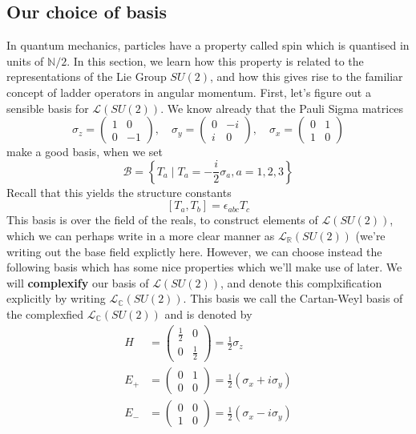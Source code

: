 \subsection{Our choice of basis}  
In quantum mechanics, particles have a property called spin which is quantised in units of $\mathbb{ N} / 2 $. In this section, we learn how this property is related to the representations of the Lie Group $SU(2)$, and how this gives rise to the familiar concept of ladder operators in angular momentum. First, let's figure out a sensible basis for $\mathcal{ L }( SU(2) ) $. We know already that the Pauli Sigma matrices \[ 
\sigma_z = \begin{pmatrix} 1 & 0 \\ 0 & - 1 \end{pmatrix}, \quad \sigma_y  = \begin{pmatrix} 0 & -i \\ i & 0 \end{pmatrix}, \quad \sigma_x =  \begin{pmatrix} 0  & 1 \\ 1 & 0 \end{pmatrix} \]   
make a good basis, when we set 
\[
 \mathcal{ B  } = \left\{  T_a \mid T_a = - \frac{i }{ 2 } \sigma_a , a = 1, 2, 3 \right\} 
\] Recall that this yields the structure constants 
\[
 [ T_a , T_ b ] = \epsilon_{ ab c } T_c
\]  
This basis is over the field of the reals, to construct 
elements of $ \mathcal{ L } ( SU ( 2) ) $, which we can perhaps 
write in a more clear manner as $ \mathcal{ L }_{ \mathbb { R} } ( SU ( 2) ) $ 
(we're writing out the base field explictly here. 
However, we can choose instead the following basis which has some nice properties which we'll make use of later. We will \textbf{complexify} our
basis of $\mathcal{ L } ( SU ( 2) ) $, and denote 
this complxification explicitly by writing $ \mathcal{ L }_\mathbb{ C} ( SU ( 2) ) $. 
This basis we call the Cartan-Weyl basis of the complexfied $ \mathcal{ L }_\mathbb{ C} ( SU ( 2) ) $
and is denoted by 
\begin{align*}
H & = \begin{pmatrix} \frac{ 1} {2} & 0 \\ 0 & \frac{1}{2} \end{pmatrix} = \frac{1}{2} \sigma_z  \\ 
E_+ &= \begin{pmatrix} 0 & 1 \\ 0 & 0 \end{pmatrix} = \frac{1}{2} ( \sigma_x + i \sigma_y )  \\ 
E_- &= \begin{pmatrix} 0 & 0 \\ 1 & 0 \end{pmatrix} = \frac{1}{2} ( \sigma_x - i \sigma_y)  
\end{align*} 
